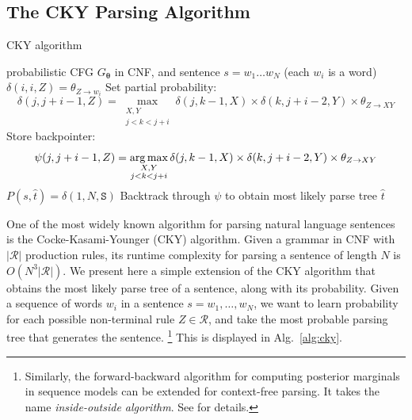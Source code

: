\subsection{The CKY Parsing Algorithm}

\begin{algorithm}[h!]
   \caption{CKY algorithm \label{alg:cky}}
\begin{algorithmic}[1]
    probabilistic CFG ${G}_{\boldsymbol{\theta}}$ in CNF, and sentence $s=w_1\ldots w_N$ (each $w_i$ is a word)
	\STATE   
   \STATE {}
	\STATE
   \STATE {}
	\STATE $\delta(i,i,Z) = \theta_{Z \rightarrow w_i}$
	\ENDFOR
	\ENDFOR
	\STATE
	\STATE {}
	\STATE Set partial probability: 
	$$\delta(j,j+i-1,Z) = \max_{\substack{X,Y\\j<k<j+i}}  \delta(j,k-1,X) \times \delta(k,j+i-2,Y) \times \theta_{Z \rightarrow X Y}$$
	\STATE Store backpointer: 
	$$\psi(j,j+i-1,Z) = \operatorname*{arg\,max}_{\substack{X,Y\\j<k<j+i}}  \delta(j,k-1,X) \times \delta(k,j+i-2,Y) \times \theta_{Z \rightarrow X Y}$$
	\ENDFOR
	\ENDFOR
	\ENDFOR
	\STATE
	\STATE {}
	\STATE $P(s,{\hat t}) = \delta(1,N,\texttt{S})$
	\STATE Backtrack through $\psi$ to obtain most likely parse tree ${\hat t}$
\end{algorithmic}
\end{algorithm}


One of the most widely known algorithm for parsing natural language sentences is the 
Cocke-Kasami-Younger (CKY) algorithm. 
Given a grammar in CNF with $|\mathcal{R}|$ production rules, its runtime complexity for parsing a sentence of length $N$ 
is $O(N^3 |\mathcal{R}| )$. 
We present here a simple extension of the CKY algorithm 
that obtains the most likely parse tree of a sentence, along with its probability.%
Given a sequence of words $w_i$ in a sentence $s=w_1,\dots,w_N$, we want to learn probability for each possible non-terminal rule $Z\in \mathcal{R}$, and take the most probable parsing tree that generates the sentence.  
\footnote{Similarly, the forward-backward algorithm for computing posterior marginals in sequence models can be extended for 
context-free parsing. It takes the name \emph{inside-outside algorithm}. See \citet{Manning1999} for details.} %
This is displayed in Alg.~\ref{alg:cky}. 

